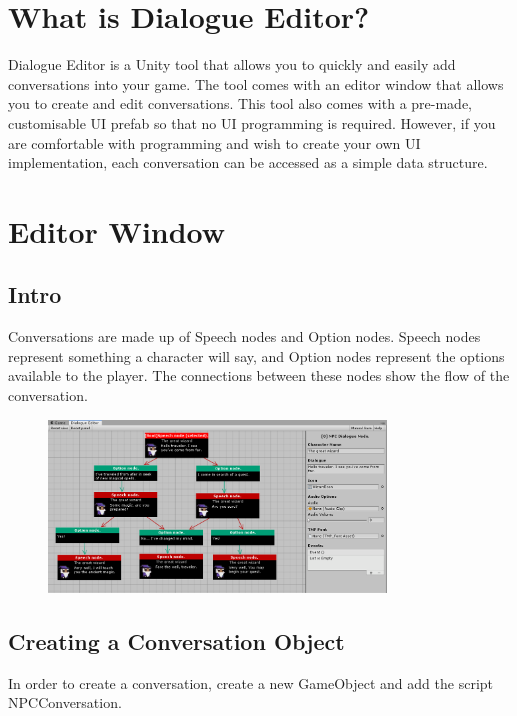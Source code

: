 \documentclass[a4paper,12pt]{article}
\begin{document}
\hypertarget{_whatis}{}
\section{What is Dialogue Editor?}
Dialogue Editor is a Unity tool that allows you to quickly and easily add conversations into your game.
\newline
The tool comes with an editor window that allows you to create and edit conversations.
\newline
This tool also comes with a pre-made, customisable UI prefab so that no UI programming is required. However, if you are comfortable with programming and wish to create your own UI implementation, each conversation can be accessed as a simple data structure.
\newpage




\hypertarget{_editorwindow}{}
\section{Editor Window}

\subsection{Intro}
Conversations are made up of Speech nodes and Option nodes. Speech nodes represent something a character will say, and Option nodes represent the options available to the player. The connections between these nodes show the flow of the conversation. 

\begin{figure}[ht]
\centering
\includegraphics[width=0.8\textwidth, keepaspectratio]{img/EditorWindowFullConversation.png}
\end{figure}


\subsection{Creating a Conversation Object}
In order to create a conversation, create a new GameObject and add the script NPCConversation. 
\end{document}
